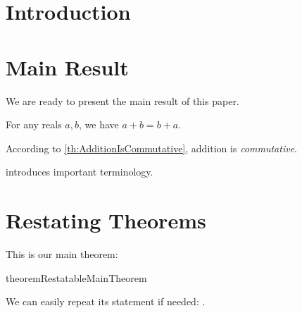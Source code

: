 \documentclass{CustomArticle}
\begin{document}
  \PrintTitleAndAbstract


  \section{Introduction}

  \lipsum[1]


  \section{Main Result}

  We are ready to present the main result of this paper.

  \begin{theorem}\label{th:AdditionIsCommutative}
    For any reals $a, b$, we have $a + b = b + a$.
  \end{theorem}

  \begin{remark}\label{th:Terminology}
    According to \cref{th:AdditionIsCommutative}, addition is \emph{commutative}.
  \end{remark}

   introduces important terminology.

  \section{Restating Theorems}

  This is our main theorem:
  \begin{restatable}{theorem}{RestatableMainTheorem}
    \lipsum[1-2][1-2]
  \end{restatable}

  We can easily repeat its statement if needed: \RestatableMainTheorem*.
\end{document}
